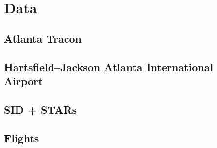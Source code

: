 \chapter{Data}
\section{Atlanta Tracon}
\section{Hartsfield–Jackson Atlanta International Airport}
\section{SID + STARs}
\section{Flights}







